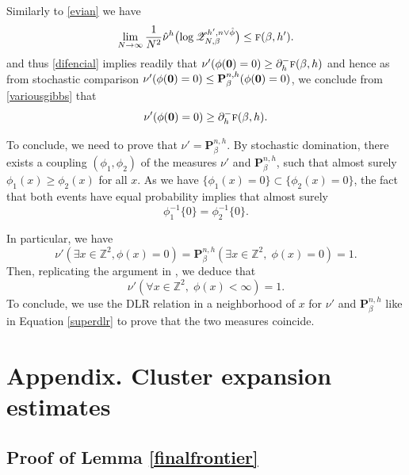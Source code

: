\documentclass[10pt]{amsart}
\let\mathcal\mathscr
\numberwithin{equation}{section}
\theoremstyle{plain}
\theoremstyle{definition}
\newcommand{\cZ}{{\ensuremath{\mathcal Z}} }
\newcommand{\bP}{{\ensuremath{\mathbf P}} }
\newcommand{\bbZ}{{\ensuremath{\mathbb Z}} }
\newcommand{\gb}{\beta}
\newcommand{\tf}{\textsc{f}}
\begin{document}
Similarly to \eqref{evian} we have
\begin{equation*}
\lim_{N\to \infty}\frac{1}{N^2}\hat \nu^{h}\bigl(\log \cZ^{h',n\vee \hat \phi}_{N,\gb}\bigr)\le \tf(\gb,h').
\end{equation*}
and thus \eqref{difencial} implies readily that
$\nu'(\phi({\bf 0})=0)\ge \partial^-_h\tf(\gb,h)$
and hence as from stochastic comparison $\nu'(\phi({\bf 0})=0)\le \bP^{n,h}_{\gb}(\phi({\bf 0})=0)$, we conclude from \eqref{variousgibbs} that
\[
\nu'(\phi({\bf 0})=0)\ge \partial^-_h\tf(\gb,h).
\]

To conclude, we need to prove that $\nu'=\bP^{n,h}_{\gb}$.
By stochastic domination, there exists a coupling $(\phi_1,\phi_2)$ of the measures $\nu'$ and $\bP^{n,h}_{\gb}$,
such that almost surely $\phi_1(x)\ge \phi_2(x)$ for all $x$. As we have $\{\phi_1(x)=0\}\subset \{\phi_2(x)=0\}$,
the fact that both events have equal probability implies that almost surely
\[
\phi^{-1}_1\{0\}=\phi^{-1}_2\{0\}.
\]

In particular, we have
\begin{equation*}
\nu'(\exists x\in \bbZ^2, \phi(x)=0)= \bP^{n,h}_{\gb}(\exists x\in \bbZ^2,\; \phi(x)=0)=1.
\end{equation*}
Then, replicating the argument in \cite[\S 5]{cf:GL}, we deduce that
\begin{equation*}
\nu'(\forall x\in \bbZ^2,\; \phi(x)<\infty)=1.
\end{equation*}
To conclude, we use the DLR relation in a neighborhood of $x$ for $\nu'$ and $\bP^{n,h}_{\gb}$ like in Equation \eqref{superdlr} to prove that the two measures coincide.

\appendix

\section*{Appendix. Cluster expansion estimates}
\label{apclus}

\subsection{Proof of Lemma \ref{finalfrontier}}\label{pfinal}
\end{document}
